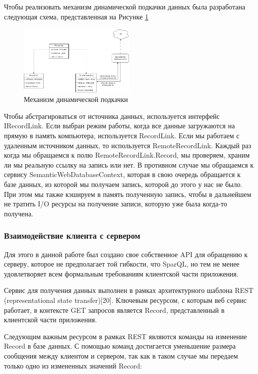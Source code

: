\documentclass[12pt]{article}
\begin{document}
Чтобы реализовать механизм динамической подкачки данных была разработана следующая схема, представленная на Рисунке \ref{fig:remote_conn}

\begin{figure}[!ht]
    \centering
    \includegraphics[width=0.5\textwidth]{_images/remote_conn.png}
    \caption{Механизм динамической подкачки}
    \label{fig:remote_conn}
\end{figure}

Чтобы абстрагироваться от источника данных, используется интерфейс IRecordLink. Если выбран режим работы, когда все данные загружаются на прямую в память компьютера, используется RecordLink. Если мы работаем с удаленным источником данных, то используется RemoteRecordLink. Каждый раз когда мы обращаемся к полю RemoteRecordLink.Record, мы проверяем, храним ли мы реальную ссылку на запись или нет. В противном случае мы обращаемся к сервису SemanticWebDatabaseContext, которая в свою очередь обращается к базе данных, из которой мы получаем запись, которой до этого у нас не было. При этом мы также кэшируем в память полученную запись, чтобы в дальнейшем не тратить I/O ресурсы на получение записи, которую уже была когда-то получена.

\subsubsection{Взаимодействие клиента с сервером}
\qquad Для этого в данной работе был создано свое собственное API для обращению к серверу, которое не предполагает той гибкости, что SparQL, но тем не менее удовлетворяет всем формальным требованиям клиентской части приложения.

Сервис для получения данных выполнен в рамках архитектурного шаблона REST (representational state transfer)[20]. Ключевым ресурсом, с которым веб сервис работает, в контексте GET запросов является Record, представленный в клиентской части приложения.

Следующим важным ресурсом в рамках REST являются команды на изменение Record в базе данных. С помощью команд достигается уменьшение размера сообщения между клиентом и сервером, так как в таком случае мы передаем только одно из измененных значений Record:
\end{document}
